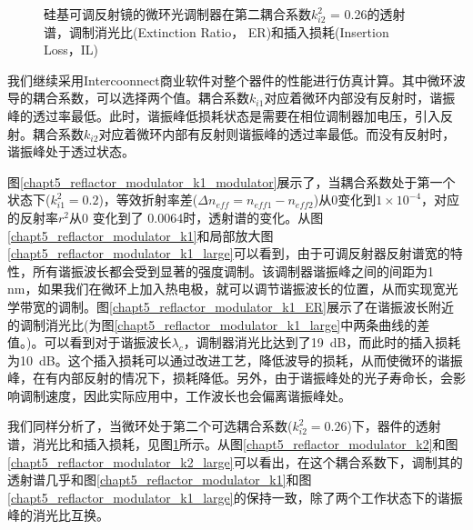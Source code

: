 \begin{figure}[htb]
{\begin{minipage}[]{0.5\textwidth}
		\end{minipage}}		
	\caption{硅基可调反射镜的微环光调制器在第二耦合系数$k_{i2}^2$ = 0.26的透射谱，调制消光比(Extinction Ratio， ER)和插入损耗(Insertion Loss，IL)}
	\label{chapt5_reflactor_modulator_k2_modulator}	
\end{figure}	
我们继续采用Intercoonnect商业软件对整个器件的性能进行仿真计算。其中微环波导的耦合系数，可以选择两个值。耦合系数$k_{i1}$对应着微环内部没有反射时，谐振峰的透过率最低。此时，谐振峰低损耗状态是需要在相位调制器加电压，引入反射。耦合系数$k_{i2}$对应着微环内部有反射则谐振峰的透过率最低。而没有反射时，谐振峰处于透过状态。

图\ref{chapt5_reflactor_modulator_k1_modulator}展示了，当耦合系数处于第一个状态下($k_{i1}^2 = 0.2$)，等效折射率差($\Delta n_{eff} = n_{eff1}-n_{eff2}$)从0变化到$1 \times  10^{-4}$，对应的反射率$r^2$从0 变化到了 0.0064时，透射谱的变化。从图\ref{chapt5_reflactor_modulator_k1}和局部放大图\ref{chapt5_reflactor_modulator_k1_large}可以看到，由于可调反射器反射谱宽的特性，所有谐振波长都会受到显著的强度调制。该调制器谐振峰之间的间距为1 nm，如果我们在微环上加入热电极，就可以调节谐振波长的位置，从而实现宽光学带宽的调制。图\ref{chapt5_reflactor_modulator_k1_ER}展示了在谐振波长附近的调制消光比(为图\ref{chapt5_reflactor_modulator_k1_large}中两条曲线的差值。)。可以看到对于谐振波长$\lambda_c$，调制器消光比达到了19~dB，而此时的插入损耗为10~dB。这个插入损耗可以通过改进工艺，降低波导的损耗，从而使微环的谐振峰，在有内部反射的情况下，损耗降低。另外，由于谐振峰处的光子寿命长，会影响调制速度，因此实际应用中，工作波长也会偏离谐振峰处。

我们同样分析了，当微环处于第二个可选耦合系数($k_{i2}^2 = 0.26$)下，器件的透射谱，消光比和插入损耗，见图\ref{chapt5_reflactor_modulator_k2_modulator}所示。从图\ref{chapt5_reflactor_modulator_k2}和图\ref{chapt5_reflactor_modulator_k2_large}可以看出，在这个耦合系数下，调制其的透射谱几乎和图\ref{chapt5_reflactor_modulator_k1}和图\ref{chapt5_reflactor_modulator_k1_large}的保持一致，除了两个工作状态下的谐振峰的消光比互换。

